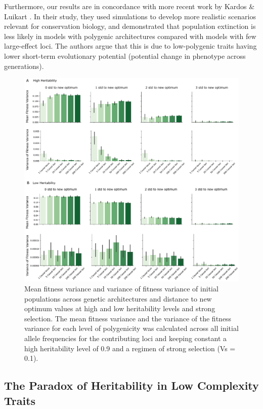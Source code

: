 \documentclass{article}
\begin{document}
Furthermore, our results are in concordance with more recent work by Kardos \& Luikart \citep{Kardos2021-jd}. In their study, they used simulations to develop more realistic scenarios relevant for conservation biology, and demonstrated that population extinction is less likely in models with polygenic architectures compared with models with few large-effect loci. The authors argue that this is due to low-polygenic traits having lower short-term evolutionary potential (potential change in phenotype across generations).

\begin{figure}[H]
    \centering
    \includegraphics[width=1\textwidth]{figures/mean_var_of_fitness_var_ipop_sel0.1.pdf}
    \caption{Mean fitness variance and variance of fitness variance of initial populations across genetic architectures and distance to new optimum values at high and low heritability levels and strong selection. The mean fitness variance and the variance of the fitness variance for each level of polygenicity was calculated across all initial allele frequencies for the contributing loci and keeping constant a high heritability level of 0.9 and a regimen of strong selection (Vs = 0.1).}
    \label{fig:initial_pop_meanandvar_fitvar}
\end{figure}

\subsection{The Paradox of Heritability in Low Complexity Traits}
\end{document}
